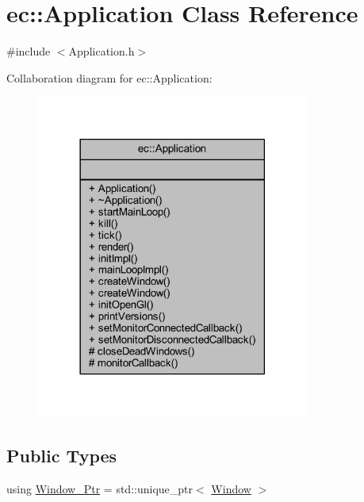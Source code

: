 \hypertarget{classec_1_1_application}{}\section{ec\+:\+:Application Class Reference}
\label{classec_1_1_application}


{\ttfamily \#include $<$Application.\+h$>$}



Collaboration diagram for ec\+:\+:Application\+:\nopagebreak
\begin{figure}[H]
\begin{center}
\leavevmode
\includegraphics[width=254pt]{classec_1_1_application__coll__graph}
\end{center}
\end{figure}
\subsection*{Public Types}
\begin{DoxyCompactItemize}
\item 
using \mbox{\hyperlink{classec_1_1_application_af1e09a0f1b603eab8d3245d8b8075ad5}{Window\+\_\+\+Ptr}} = std\+::unique\+\_\+ptr$<$ \mbox{\hyperlink{classec_1_1_window}{Window}} $>$
\end{DoxyCompactItemize}
